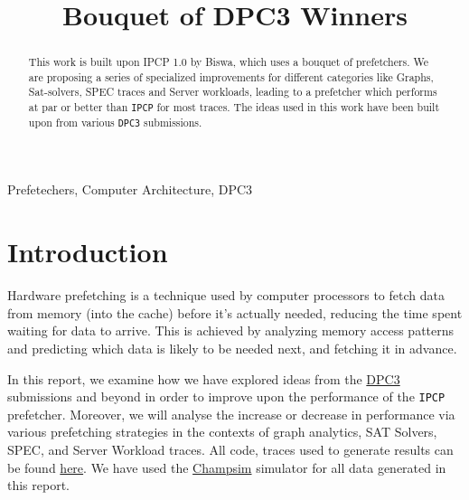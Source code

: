 \documentclass[conference]{IEEEtran}
\begin{document}
\title{Bouquet of DPC3 Winners}


\author{
}

\maketitle

\begin{abstract}
This work is built upon IPCP 1.0 by Biswa, which uses a bouquet of prefetchers. We are proposing a series of specialized improvements for different categories like Graphs, Sat-solvers, SPEC traces and Server workloads, leading to a prefetcher which performs at par or better than \verb|IPCP| for most traces. The ideas used in this work have been built upon from various \verb|DPC3| submissions\cite{b1}\cite{b2}\cite{b3}. 
\end{abstract}

\begin{IEEEkeywords}
Prefetechers, Computer Architecture, DPC3 
\end{IEEEkeywords}

\section{Introduction}
Hardware prefetching is a technique used by computer processors to fetch data from memory (into the cache) before it's actually needed, reducing the time spent waiting for data to arrive. This is achieved by analyzing memory access patterns and predicting which data is likely to be needed next, and fetching it in advance. 

In this report, we examine how we have explored ideas from the \href{https://dpc3.compas.cs.stonybrook.edu/?final_programs}{DPC3} submissions and beyond in order to improve upon the performance of the \verb|IPCP| prefetcher. Moreover, we will analyse the increase or decrease in performance via various prefetching strategies in the contexts of graph analytics, SAT Solvers, SPEC, and Server Workload traces. All code, traces used to generate results can be found \href{https://github.com/ChopstickAyush/Riscy\_Data\_Prefetching}{here}. We have used the \href{https://github.com/ChampSim/ChampSim}{Champsim} simulator for all data generated in this report.
\end{document}
